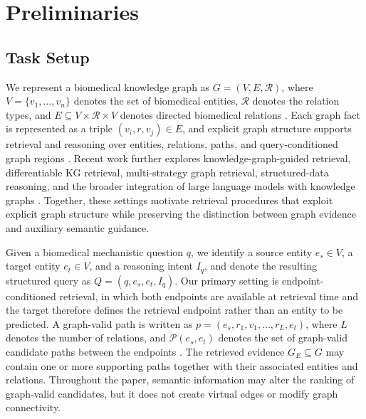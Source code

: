 \documentclass{article} %
\begin{document}
\section{Preliminaries}
\label{sec:preliminaries}



\subsection{Task Setup}
\label{sec:task_setup}

We represent a biomedical knowledge graph as $G=(V,E,\mathcal{R})$, where
$V=\{v_1,\ldots,v_n\}$ denotes the set of biomedical entities,
$\mathcal{R}$ denotes the relation types, and
$E\subseteq V\times\mathcal{R}\times V$ denotes directed biomedical
relations \citep{himmelstein2017hetionet,chandak2023primekg}. Each graph fact
is represented as a triple $(v_i,r,v_j)\in E$, and explicit graph structure
supports retrieval and reasoning over entities, relations, paths, and
query-conditioned graph regions
\citep{das2018minerva,sun2024tog,ma2025tog2,yuan2025kgrag,
edge2024graphrag,he2024gretriever}. Recent work further explores
knowledge-graph-guided retrieval, differentiable KG retrieval, multi-strategy
graph retrieval, structured-data reasoning, and the broader integration of
large language models with knowledge graphs
\citep{zhu2025kg2rag,gao2025drag,mavromatis2025byokg,
jiang2023structgpt,ma2025llmkgqa}. Together, these settings motivate retrieval
procedures that exploit explicit graph structure while preserving the
distinction between graph evidence and auxiliary semantic guidance.

Given a biomedical mechanistic question $q$, we identify a source entity
$e_s\in V$, a target entity $e_t\in V$, and a reasoning intent $I_q$, and
denote the resulting structured query as $Q=(q,e_s,e_t,I_q)$. Our primary
setting is endpoint-conditioned retrieval, in which both endpoints are
available at retrieval time and the target therefore defines the retrieval
endpoint rather than an entity to be predicted. A graph-valid path is written
as $p=(e_s,r_1,v_1,\ldots,r_L,e_t)$, where $L$ denotes the number of
relations, and $\mathcal{P}(e_s,e_t)$ denotes the set of graph-valid candidate
paths between the endpoints
\citep{das2018minerva,lin2018multihop,sun2019pullnet,
gutierrez2025hipporag2,guo2024lightrag}. The retrieved evidence
$G_E\subseteq G$ may contain one or more supporting paths together with their
associated entities and relations. Throughout the paper, semantic information
may alter the ranking of graph-valid candidates, but it does not create
virtual edges or modify graph connectivity.
\end{document}
